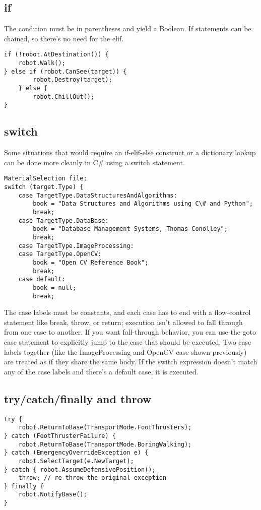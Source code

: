 \documentclass[12pt,a4paper,final,twoside,onecolumn,titlepage]{book}
\begin{document}
\subsection{if}
The condition must be in parentheses and yield a Boolean. If statements can be chained, so there’s no need for the elif.
\begin{lstlisting}
if (!robot.AtDestination()) { 
	robot.Walk();
} else if (robot.CanSee(target)) { 
		robot.Destroy(target);
	} else { 
		robot.ChillOut();
}
\end{lstlisting}
\subsection{switch}
Some situations that would require an if-elif-else construct or a dictionary lookup can be done more cleanly in C\# using a switch statement.
\begin{lstlisting}
MaterialSelection file; 
switch (target.Type) {
	case TargetType.DataStructuresAndAlgorithms: 
		book = "Data Structures and Algorithms using C\# and Python"; 
		break;
	case TargetType.DataBase: 
		book = "Database Management Systems, Thomas Conolley"; 
		break;
	case TargetType.ImageProcessing: 
	case TargetType.OpenCV:
		book = "Open CV Reference Book";
		break; 
	case default:
		book = null; 
		break;
\end{lstlisting}
The case labels must be constants, and each case has to end with a flow-control statement like break, throw, or return; execution isn’t allowed to fall through from one case to another. If you want fall-through behavior, you can use the goto case statement to explicitly jump to the case that should be executed. Two case labels together (like the ImageProcessing and OpenCV case shown previously) are treated as if they share the same body. If the switch expression doesn’t match any of the case labels and there’s a default case, it is executed.
\subsection{try/catch/finally and throw}
\begin{lstlisting}
try { 
	robot.ReturnToBase(TransportMode.FootThrusters);
} catch (FootThrusterFailure) { 
	robot.ReturnToBase(TransportMode.BoringWalking);
} catch (EmergencyOverrideException e) { 
	robot.SelectTarget(e.NewTarget);
} catch { robot.AssumeDefensivePosition(); 
	throw; // re-throw the original exception
} finally { 
	robot.NotifyBase();
}
\end{lstlisting}
\end{document}
